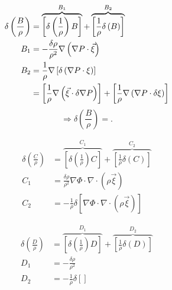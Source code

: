         \begin{align}
            \delta\left( \frac{B}{\rho} \right)
            &=
            \overbrace{\left[\delta\left(\frac{1}{\rho}\right) B\right]}^{B_1}
            +
            \overbrace{\left[\frac{1}{\rho} \delta\left( B \right)\right]}^{B_2}
            \\
            B_1
            &=
            -\frac{\delta\rho}{\rho^2}
            \nabla\left( \nabla P \cdot \vec\xi \right)
            \\
            B_2
            &=
            \frac{1}{\rho}
            \nabla\left[
                \delta\left(
                    \nabla P \cdot \xi
                \right)
            \right]
            \notag\\
            &=
            \left[
                \frac{1}{\rho}
                \nabla\left( \vec\xi \cdot \delta\nabla P \right)
            \right]
            +
            \left[
                \frac{1}{\rho}
                \nabla\left( \nabla P \cdot \delta \xi  \right)
            \right]
        \end{align}
        \begin{equation} \Rightarrow \boxed{
            \delta\left( \frac{B}{\rho} \right)
            = 
            .
        }\end{equation}
    \item[C.]
        \begin{align}
            \delta\left( \frac{C}{\rho} \right)
            &=
            \overbrace{\left[\delta\left(\frac{1}{\rho}\right) C \right]}^{C_1}
            +
            \overbrace{\left[\frac{1}{\rho} \delta\left( C \right)\right]}^{C_2}
            \\
            C_1
            &=
            \frac{\delta\rho}{\rho^2}
            \nabla\Phi\cdot\nabla\cdot\left(\rho\vec\xi\right)
            \\
            C_2
            &=
            -\frac{1}{\rho}
            \delta\left[
                \nabla\Phi\cdot\nabla\cdot\left(\rho\vec\xi\right)
            \right]
        \end{align}
    \item[D.]
        \begin{align}
            \delta\left( \frac{D}{\rho} \right)
            &=
            \overbrace{\left[\delta\left(\frac{1}{\rho}\right) D \right]}^{D_1}
            +
            \overbrace{\left[\frac{1}{\rho} \delta\left( D \right)\right]}^{D_2}
            \\
            D_1
            &=
            -\frac{\delta\rho}{\rho^2}
            
            \\
            D_2
            &=
            -\frac{1}{\rho}
            \delta\left[
                
            \right]
        \end{align}
